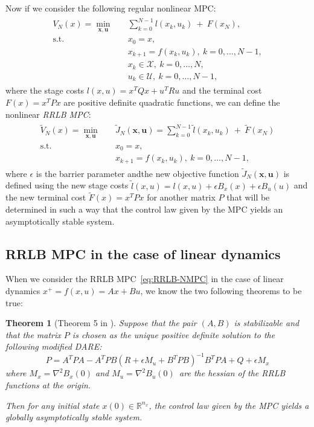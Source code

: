 \documentclass[conference]{IEEEtran}
\newtheorem{theorem}{Theorem}[section]
\theoremstyle{definition}
\theoremstyle{remark}
\def\cal#1{\mathcal{#1}}
\def\bf#1{\mathbf{#1}}
\newcommand{\R}{\mathbb{R}}
\begin{document}
Now if we consider the following regular nonlinear MPC:
\begin{align}
	\begin{split}
		\label{eq:NMPC}
		V_N(x)=\underset{\bf{x},\bf{u}}{\min} &\quad \sum_{k=0}^{N-1}l(x_k,u_k)~+~F(x_N),\\
		\text{s.t.} &\quad x_0=x,\\
		&\quad x_{k+1}=f(x_k,u_k),~k=0,\ldots,N-1,\\
		&\quad x_k\in\cal{X},~k=0,\ldots,N,\\
		&\quad u_k\in\cal{U},~k=0,\ldots,N-1,
	\end{split}
\end{align}
where the stage costs $l(x,u)=x^TQx+u^TRu$ and the terminal cost $F(x)=x^TPx$ are positive definite quadratic functions, we can define the nonlinear \textit{RRLB MPC}:
\begin{align}
	\begin{split}\label{eq:RRLB-NMPC}
		\tilde{V}_N(x)=\underset{\bf{x},\bf{u}}{\min} &\quad \tilde{J}_N(\bf{x},\bf{u})=\sum_{k=0}^{N-1}\tilde{l}(x_k,u_k)~+~\tilde{F}(x_N)\\
		\text{s.t.} &\quad x_0=x,\\
		&\quad x_{k+1}=f(x_k,u_k),~k=0,\ldots,N-1,
	\end{split}
\end{align}
where $\epsilon$ is the barrier parameter andthe new objective function $\tilde{J}_N(\bf{x},\bf{u})$ is defined using the new stage costs $\tilde{l}(x,u)=l(x,u)+\epsilon B_x(x)+\epsilon B_u(u)$ and the new terminal cost $\tilde{F}(x)=x^TPx$ for another matrix $P$ that will be determined in such a way that the control law given by the MPC yields an asymptotically stable system.

\subsection{RRLB MPC in the case of linear dynamics}

When we consider the RRLB MPC~\ref{eq:RRLB-NMPC} in the case of linear dynamics $x^+=f(x,u)=Ax+Bu$, we know the two following theorems to be true:

\begin{theorem}[Theorem 5 in \cite{RRLB-linear-MPC}]
	\label{nominal-stability-linear-case}
	Suppose that the pair $(A,B)$ is stabilizable and that the matrix $P$ is chosen as the unique positive definite solution to the following modified DARE:
	\begin{equation}
		P=A^TPA-A^TPB(R+\epsilon M_u+B^TPB)^{-1}B^TPA+Q+\epsilon M_x
	\end{equation}
	where $M_x=\nabla^2 B_x(0)$ and $M_u=\nabla^2 B_u(0)$\, are the hessian of the RRLB functions at the origin.

	Then for any initial state $x(0)\in\R^{n_x}$, the control law given by the MPC yields a globally asymptotically stable system.
\end{theorem}
\end{document}
